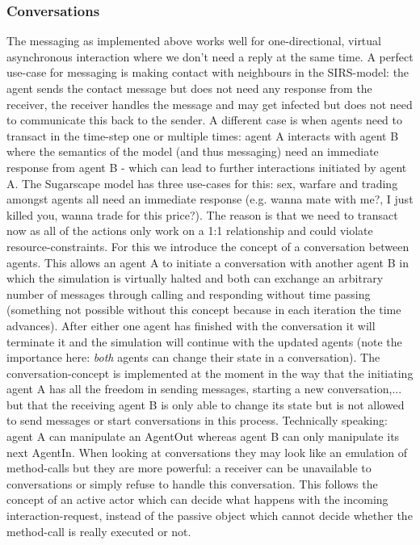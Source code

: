 \subsubsection{Conversations}
The messaging as implemented above works well for one-directional, virtual asynchronous interaction where we don't need a reply at the same time. A perfect use-case for messaging is making contact with neighbours in the SIRS-model: the agent sends the contact message but does not need any response from the receiver, the receiver handles the message and may get infected but does not need to communicate this back to the sender. 
A different case is when agents need to transact in the time-step one or multiple times: agent A interacts with agent B where the semantics of the model (and thus messaging) need an immediate response from agent B - which can lead to further interactions initiated by agent A. The Sugarscape model has three use-cases for this: sex, warfare and trading amongst agents all need an immediate response (e.g. wanna mate with me?, I just killed you, wanna trade for this price?). The reason is that we need to transact now as all of the actions only work on a 1:1 relationship and could violate resource-constraints.
For this we introduce the concept of a conversation between agents. This allows an agent A to initiate a conversation with another agent B in which the simulation is virtually halted and both can exchange an arbitrary number of messages through calling and responding without time passing (something not possible without this concept because in each iteration the time advances). After either one agent has finished with the conversation it will terminate it and the simulation will continue with the updated agents (note the importance here: \textit{both} agents can change their state in a conversation). The conversation-concept is implemented at the moment in the way that the initiating agent A has all the freedom in sending messages, starting a new conversation,... but that the receiving agent B is only able to change its state but is not allowed to send messages or start conversations in this process. Technically speaking: agent A can manipulate an AgentOut whereas agent B can only manipulate its next AgentIn.
When looking at conversations they may look like an emulation of method-calls but they are more powerful: a receiver can be unavailable to conversations or simply refuse to handle this conversation. This follows the concept of an active actor which can decide what happens with the incoming interaction-request, instead of the passive object which cannot decide whether the method-call is really executed or not.


